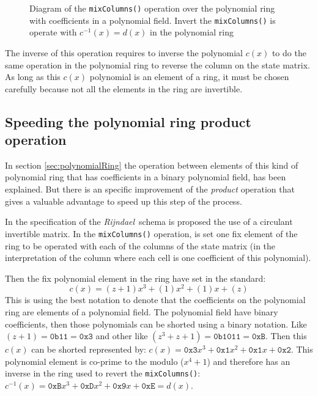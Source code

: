 \documentclass[10pt,a4paper,twoside]{llncs}
\newcommand{\rijndael}{\emph{Rijndael}}
\begin{document}

\begin{figure}[ht]
\begin{center}

\caption{Diagram of the {\tt mixColumns()} operation over the polynomial ring with coefficients in a polynomial field. Invert the {\tt mixColumns()} is operate with $c^{-1}(x)=d(x)$ in the polynomial ring}
\label{fig:mixColumns}
\end{center}
\end{figure}

The inverse of this operation requires to inverse the polynomial $c(x)$ to do the same operation in the polynomial ring to reverse the column on the state matrix. As long as this $c(x)$ polynomial is an element of a ring, it must be chosen carefully because not all the elements in the ring are invertible.

\subsection{Speeding the polynomial ring product operation}\label{sec:improvePolynomialRingProduct}
In section \ref{sec:polynomialRing} the operation between elements of this kind of polynomial ring that has coefficients in a binary polynomial field, has been explained. But there is an specific improvement of the \emph{product} operation that gives a valuable advantage to speed up this step of the process. 

In the specification of the \rijndael\, schema \cite{Daemen01aes-ammended} is proposed the use of a circulant invertible matrix. In the {\tt mixColumns()} operation, is set one fix element of the ring to be operated with each of the columns of the state matrix (in the interpretation of the column where each cell is one coefficient of this polynomial).

Then the fix polynomial element in the ring have set in the standard:
$$c(x) = (z+1)x^3+(1)x^2+(1)x+(z)$$
This is using the best notation to denote that the coefficients on the polynomial ring are elements of a polynomial field. The polynomial field have binary coefficients, then those polynomials can be shorted using a binary notation. Like $(z+1)=\texttt{0b11}=\texttt{0x3}$ and other like $(z^3+z+1)=\texttt{0b1011}=\texttt{0xB}$. Then this $c(x)$ can be shorted represented by: $c(x) = \texttt{0x3}x^3+\texttt{0x1}x^2+\texttt{0x1}x+\texttt{0x2}$. This polynomial element is co-prime to the modulo ($x^4+1$) and therefore has an inverse in the ring used to revert the {\tt mixColumns()}: $c^{-1}(x) = \texttt{0xB}x^3+\texttt{0xD}x^2+\texttt{0x9}x+\texttt{0xE}=d(x)$.
\end{document}
